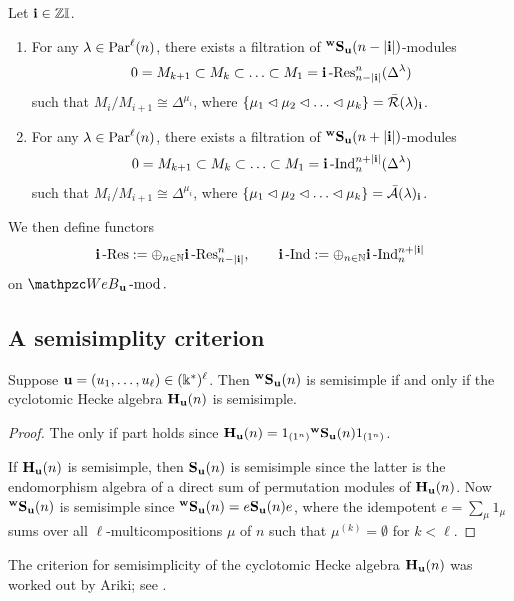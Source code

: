 \begin{proposition}
\label{prop:IndRes}
Let $\mathbf{i} \in \mathbb{Z} \mathbb{I}$. 
\begin{enumerate}
    \item     For any $\lambda\in \text{Par}^\ell(n)$, there exists a filtration of ${}^{\bold{w}}\bold{S}_{\mathbf{u}}(n-|\mathbf{i}|)$-modules 
    \[0=M_{k+1}\subset M_k\subset \ldots \subset M_1=\mathbf{i}\operatorname{-Res}\nolimits^n_{n-|\mathbf{i}|} (\Delta^\lambda) \]
    such that $M_i/M_{i+1}\cong \Delta^{\mu_i}$, 
    where $\{\mu_1\lhd \mu_2\lhd\ldots\lhd\mu_k \}=\bar {\mathcal R}(\lambda)_{\mathbf{i}}$.
    \item For any $\lambda\in \text{Par}^\ell(n)$, there exists a filtration of ${}^{\bold{w}}\bold{S}_{\mathbf{u}}(n+|\mathbf{i}|)$-modules 
    \[0=M_{k+1}\subset M_k\subset \ldots \subset M_1=\mathbf{i}\operatorname{-Ind}\nolimits^{n+|\mathbf{i}|}_{n} (\Delta^\lambda) \]
    such that $M_i/M_{i+1}\cong \Delta^{\mu_i}$, 
    where $\{\mu_1\lhd \mu_2\lhd\ldots\lhd\mu_k \}=\bar {\mathcal A}(\lambda)_{\mathbf{i}}$. 
\end{enumerate}    
\end{proposition}

We then define functors
\[
\mathbf{i}\operatorname{-Res}\nolimits:= \oplus_{n\in \mathbb{N}}\mathbf{i}\operatorname{-Res}\nolimits^n_{n-|\mathbf{i}|}, \qquad \mathbf{i}\operatorname{-Ind}\nolimits:= \oplus_{n\in\mathbb{N}}\mathbf{i}\operatorname{-Ind}\nolimits^{n+|\mathbf{i}|}_n
\] 
on $\qW_\bfu\modf.$


\subsection{A semisimplity criterion}


\begin{proposition}
\label{prop:semisimple} 
Suppose $\mathbf{u}=(u_1,\ldots,u_\ell)\in (\Bbbk^*)^\ell$. Then ${}^{\bold{w}}\bold{S}_{\mathbf{u}}(n)$ is semisimple if and only if the cyclotomic Hecke algebra $\mathbf{H}_{\mathbf{u}}(n)$ is semisimple. 
\end{proposition}

\begin{proof}
   The only if part holds  since $\mathbf{H}_{\mathbf{u}}(n)= 1_{(1^n)}{}^{\bold{w}}\bold{S}_{\mathbf{u}}(n) 1_{(1^n)}$.

   If $\mathbf{H}_{\mathbf{u}}(n)$ is semisimple, then $ \mathbf{S}_{\mathbf{u}}(n)$ is semisimple since the latter is the endomorphism algebra of a direct sum of permutation modules of $\mathbf{H}_{\mathbf{u}}(n)$. Now ${}^{\bold{w}}\bold{S}_{\mathbf{u}}(n)$ is semisimple since 
   $ {}^{\bold{w}}\bold{S}_{\mathbf{u}}(n)=e\mathbf{S}_{\mathbf{u}}(n)e$, where the idempotent $e=\sum_\mu 1_\mu$ sums over all $\ell$-multicompositions $\mu$ of $n$ such that $\mu^{(k)}=\emptyset$ for $k<\ell$.
\end{proof}

The criterion for semisimplicity of the cyclotomic Hecke algebra $\mathbf{H}_{\mathbf{u}}(n)$ was worked out by Ariki; see \cite{Ar02}.
